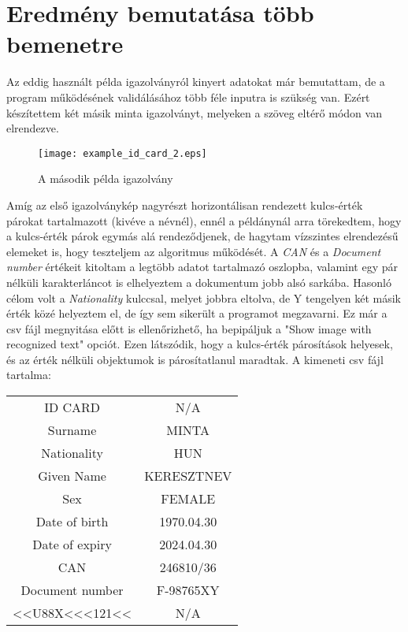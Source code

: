 \documentclass[12pt]{report}
\begin{document}
\section{Eredmény bemutatása több bemenetre}

Az eddig használt példa igazolványról kinyert adatokat már bemutattam, de a program működésének validálásához több féle inputra is szükség van. Ezért készítettem két másik minta igazolványt, melyeken a szöveg eltérő módon van elrendezve.

\newpage

\begin{figure}[h]
    \centerline{\texttt{[image: example\_id\_card\_2.eps]}}
    \caption{A második példa igazolvány}
\end{figure}

Amíg az első igazolványkép nagyrészt horizontálisan rendezett kulcs-érték párokat tartalmazott (kivéve a névnél), ennél a példánynál arra törekedtem, hogy a kulcs-érték párok egymás alá rendeződjenek, de hagytam vízszintes elrendezésű elemeket is, hogy teszteljem az algoritmus működését.
A \emph{CAN} és a \emph{Document number} értékeit kitoltam a legtöbb adatot tartalmazó oszlopba, valamint egy pár nélküli karakterláncot is elhelyeztem a dokumentum jobb alsó sarkába. Hasonló célom volt a \emph{Nationality} kulccsal, melyet jobbra eltolva, de Y tengelyen két másik érték közé helyeztem el, de így sem sikerült a programot megzavarni. Ez már a csv fájl megnyitása előtt is ellenőrizhető, ha bepipáljuk a "Show image with recognized text" opciót. Ezen látszódik, hogy a kulcs-érték párosítások helyesek, és az érték nélküli objektumok is párosítatlanul maradtak. A kimeneti csv fájl tartalma:

\begin{tcolorbox}
    \begin{center}
        \begin{tabular}{ c c }
            ID CARD & N/A \\ 
            Surname & MINTA \\
            Nationality & HUN \\
            Given Name & KERESZTNEV \\
            Sex & FEMALE \\
            Date of birth & 1970.04.30 \\
            Date of expiry & 2024.04.30 \\
            CAN & 246810/36 \\
            Document number & F-98765XY \\
            <<U88X<<<121<< & N/A \\
        \end{tabular}
    \end{center}
\end{tcolorbox}
\end{document}
